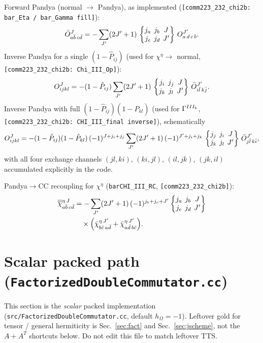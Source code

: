\documentclass[enabledeprecatedfontcommands]{scrartcl}
\newcommand{\codename}[1]{\texttt{#1}}
\newcommand{\coderef}[1]{\textcolor{codeblue}{\texttt{[#1]}}}
\newcommand{\MyRomanNum}[1]{%
  \ifcase#1\or I\or II\or III\or IV\or V\or VI\or VII\or VIII\or IX\or X\else #1\fi}
\newcommand{\sixj}[6]{\begingroup\setlength{\arraycolsep}{0.2em}%
  \begin{Bmatrix} #1 & #2 & #3 \\ #4 & #5 & #6 \end{Bmatrix}\endgroup}
\begin{document}
Forward Pandya (normal $\to$ Pandya), as implemented
(\coderef{comm223\_232\_chi2b: bar\_Eta / bar\_Gamma fill}):
\begin{equation}\label{eq:pandya-fwd}
\bar O^{J}_{a\bar b\,c\bar d}
  =-\sum_{J'}(2J'+1)\,
   \sixj{j_a}{j_b}{J}{j_c}{j_d}{J'}\,
   O^{J'}_{a\,d\,c\,b}.
\end{equation}
Inverse Pandya for a single $(1-\hat P_{ij})$ (used for $\chi^\eta\to$ normal,
\coderef{comm223\_232\_chi2b: Chi\_III\_Op}):
\begin{equation}\label{eq:pandya-inv-1P}
O^{J}_{ijkl}
  =-(1-\hat P_{ij})\sum_{J'}(2J'+1)\,
   \sixj{j_i}{j_j}{J}{j_k}{j_l}{J'}\,
   \bar O^{J'}_{i\bar l\,k\bar j}.
\end{equation}
Inverse Pandya with full $(1-\hat P_{ij})(1-\hat P_{kl})$ (used for
$\Gamma^{\MyRomanNum{3}_b}$, \coderef{comm223\_232\_chi2b: CHI\_III\_final inverse}), schematically
\begin{equation}\label{eq:pandya-inv-2P}
O^{J}_{ijkl}
  =-(1-\hat P_{ij})(1-\hat P_{kl})\,(-1)^{J+j_i+j_j}
   \sum_{J'}(2J'+1)\,(-1)^{J'+j_i+j_k}\,
   \sixj{j_j}{j_i}{J}{j_k}{j_l}{J'}\,
   \bar O^{J'}_{j\bar l\,k\bar i},
\end{equation}
with all four exchange channels $(jl,ki)$, $(ki,jl)$, $(il,jk)$, $(jk,il)$
accumulated explicitly in the code.

Pandya$\to$CC recoupling for $\chi^\eta$
(\codename{barCHI\_III\_RC}, \coderef{comm223\_232\_chi2b}):
\begin{equation}\label{eq:RC}
\begin{aligned}
\overline{\overline\chi}{}^{\eta\,J}_{a\bar b\,c\bar d}
&=-\sum_{J'}(2J'+1)\,(-1)^{j_b+j_c+J'}
  \sixj{j_a}{j_b}{J}{j_c}{j_d}{J'}\\
&\quad\times\Bigl(
  \bar\chi^{\eta\,J'}_{b\bar c\,a\bar d}
 +\bar\chi^{\eta\,J'}_{a\bar d\,b\bar c}
\Bigr).
\end{aligned}
\end{equation}

\section{Scalar packed path (\codename{FactorizedDoubleCommutator.cc})}
\label{sec:code}

This section is the \emph{scalar} packed implementation
(\codename{src/FactorizedDoubleCommutator.cc}, default $h_\Omega=-1$).
Leftover gold for tensor / general hermiticity is Sec.~\ref{sec:fact}
and Sec.~\ref{sec:jscheme}, not the $A+A^{T}$ shortcuts below.
Do not edit this file to match leftover TTS.
\end{document}
